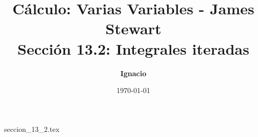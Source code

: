 \documentclass[11pt,spanish,oneside]{report}
\title{\textbf{Cálculo: Varias Variables - James Stewart} \\ \Large Sección 13.2: Integrales iteradas}
\author{\textbf{Ignacio}}
\date{\today}
\begin{document}
\maketitle

{seccion_13_2.tex}
\end{document}
